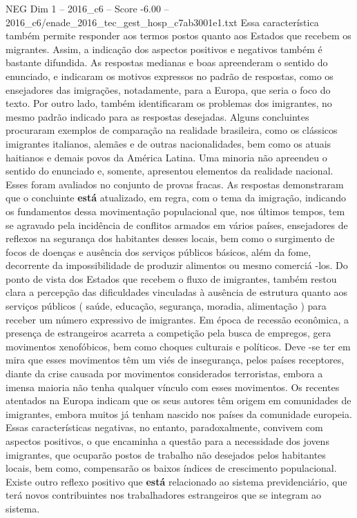 \begin{textsample}{NEG Dim 1 – 2016\_c6 – Score -6.00 – 2016\_c6/enade\_2016\_tec\_gest\_hosp\_c7ab3001e1.txt}
Essa característica também permite responder aos termos postos quanto aos Estados que recebem os migrantes.
Assim, a indicação dos aspectos positivos e negativos também é bastante difundida.
As respostas medianas e boas apreenderam o sentido do enunciado, e indicaram os motivos expressos no padrão de respostas, como os ensejadores das imigrações, notadamente, para a Europa, que seria o foco do texto.
Por outro lado, também identificaram os problemas dos imigrantes, no mesmo padrão indicado para as respostas desejadas.
Alguns concluintes procuraram exemplos de comparação na realidade brasileira, como os clássicos imigrantes italianos, alemães e de outras nacionalidades, bem como os atuais haitianos e demais povos da América Latina.
Uma minoria não apreendeu o sentido do enunciado e, somente, apresentou elementos da realidade nacional.
Esses foram avaliados no conjunto de provas fracas.
As respostas demonstraram que o concluinte \textbf{está} atualizado, em regra, com o tema da imigração, indicando os fundamentos dessa movimentação populacional que, nos últimos tempos, tem se agravado pela incidência de conflitos armados em vários países, ensejadores de reflexos na segurança dos habitantes desses locais, bem como o surgimento de focos de doenças e ausência dos serviços públicos básicos, além da fome, decorrente da impossibilidade de produzir alimentos ou mesmo comerciá -los.
Do ponto de vista dos Estados que recebem o fluxo de imigrantes, também restou clara a percepção das dificuldades vinculadas à ausência de estrutura quanto aos serviços públicos ( saúde, educação, segurança, moradia, alimentação ) para receber um número expressivo de imigrantes.
Em época de recessão econômica, a presença de estrangeiros acarreta a competição pela busca de empregos, gera movimentos xenofóbicos, bem como choques culturais e políticos.
Deve -se ter em mira que esses movimentos têm um viés de insegurança, pelos países receptores, diante da crise causada por movimentos considerados terroristas, embora a imensa maioria não tenha qualquer vínculo com esses movimentos.
Os recentes atentados na Europa indicam que os seus autores têm origem em comunidades de imigrantes, embora muitos já tenham nascido nos países da comunidade europeia.
Essas características negativas, no entanto, paradoxalmente, convivem com aspectos positivos, o que encaminha a questão para a necessidade dos jovens imigrantes, que ocuparão postos de trabalho não desejados pelos habitantes locais, bem como, compensarão os baixos índices de crescimento populacional.
Existe outro reflexo positivo que \textbf{está} relacionado ao sistema previdenciário, que terá novos contribuintes nos trabalhadores estrangeiros que se integram ao sistema.

\end{textsample}
